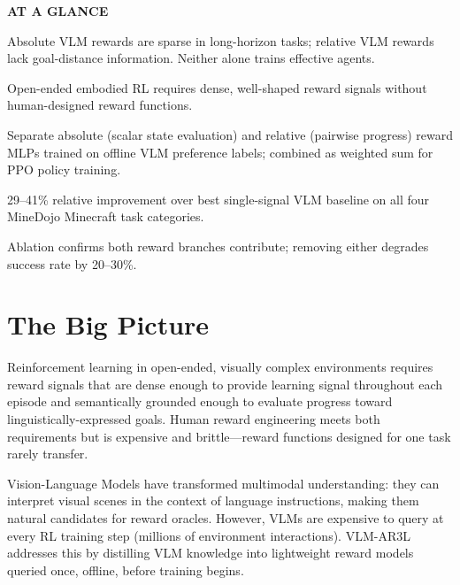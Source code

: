 \documentclass[10pt,twocolumn]{article}
\begin{document}
\begin{mdframed}[backgroundcolor=boxgray,linecolor=rulered,linewidth=1pt,
    innerleftmargin=6pt,innerrightmargin=6pt,
    innertopmargin=6pt,innerbottommargin=6pt]
\textbf{\small AT A GLANCE}\par\vspace{4pt}
\begin{description}[leftmargin=0pt,labelsep=4pt,itemsep=2pt,parsep=0pt,
    font=\small\bfseries]
  \item[Problem:] Absolute VLM rewards are sparse in long-horizon tasks;
    relative VLM rewards lack goal-distance information. Neither alone
    trains effective agents.
  \item[Why it matters:] Open-ended embodied RL requires dense,
    well-shaped reward signals without human-designed reward functions.
  \item[Method:] Separate absolute (scalar state evaluation) and relative
    (pairwise progress) reward MLPs trained on offline VLM preference
    labels; combined as weighted sum for PPO policy training.
  \item[Result:] 29--41\% relative improvement over best single-signal
    VLM baseline on all four MineDojo Minecraft task categories.
  \item[Evidence:] Ablation confirms both reward branches contribute;
    removing either degrades success rate by 20--30\%.
\end{description}
\end{mdframed}

\section{The Big Picture}

Reinforcement learning in open-ended, visually complex environments
requires reward signals that are dense enough to provide learning signal
throughout each episode and semantically grounded enough to evaluate
progress toward linguistically-expressed goals. Human reward engineering
meets both requirements but is expensive and brittle---reward functions
designed for one task rarely transfer.

Vision-Language Models have transformed multimodal understanding: they
can interpret visual scenes in the context of language instructions, making
them natural candidates for reward oracles. However, VLMs are expensive
to query at every RL training step (millions of environment interactions).
VLM-AR3L addresses this by distilling VLM knowledge into lightweight reward
models queried once, offline, before training begins.
\end{document}

